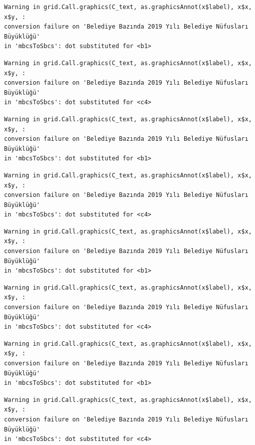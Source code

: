 \documentclass[
  11pt,
  a4paper,
  DIV=11,
  numbers=noendperiod]{scrartcl}
\begin{document}
\begin{verbatim}
Warning in grid.Call.graphics(C_text, as.graphicsAnnot(x$label), x$x, x$y, :
conversion failure on 'Belediye Bazında 2019 Yılı Belediye Nüfusları Büyüklüğü'
in 'mbcsToSbcs': dot substituted for <b1>
\end{verbatim}

\begin{verbatim}
Warning in grid.Call.graphics(C_text, as.graphicsAnnot(x$label), x$x, x$y, :
conversion failure on 'Belediye Bazında 2019 Yılı Belediye Nüfusları Büyüklüğü'
in 'mbcsToSbcs': dot substituted for <c4>
\end{verbatim}

\begin{verbatim}
Warning in grid.Call.graphics(C_text, as.graphicsAnnot(x$label), x$x, x$y, :
conversion failure on 'Belediye Bazında 2019 Yılı Belediye Nüfusları Büyüklüğü'
in 'mbcsToSbcs': dot substituted for <b1>
\end{verbatim}

\begin{verbatim}
Warning in grid.Call.graphics(C_text, as.graphicsAnnot(x$label), x$x, x$y, :
conversion failure on 'Belediye Bazında 2019 Yılı Belediye Nüfusları Büyüklüğü'
in 'mbcsToSbcs': dot substituted for <c4>
\end{verbatim}

\begin{verbatim}
Warning in grid.Call.graphics(C_text, as.graphicsAnnot(x$label), x$x, x$y, :
conversion failure on 'Belediye Bazında 2019 Yılı Belediye Nüfusları Büyüklüğü'
in 'mbcsToSbcs': dot substituted for <b1>
\end{verbatim}

\begin{verbatim}
Warning in grid.Call.graphics(C_text, as.graphicsAnnot(x$label), x$x, x$y, :
conversion failure on 'Belediye Bazında 2019 Yılı Belediye Nüfusları Büyüklüğü'
in 'mbcsToSbcs': dot substituted for <c4>
\end{verbatim}

\begin{verbatim}
Warning in grid.Call.graphics(C_text, as.graphicsAnnot(x$label), x$x, x$y, :
conversion failure on 'Belediye Bazında 2019 Yılı Belediye Nüfusları Büyüklüğü'
in 'mbcsToSbcs': dot substituted for <b1>
\end{verbatim}

\begin{verbatim}
Warning in grid.Call.graphics(C_text, as.graphicsAnnot(x$label), x$x, x$y, :
conversion failure on 'Belediye Bazında 2019 Yılı Belediye Nüfusları Büyüklüğü'
in 'mbcsToSbcs': dot substituted for <c4>
\end{verbatim}
\end{document}
